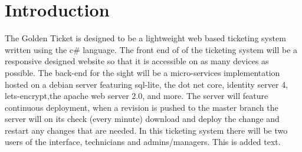 \documentclass[letterpaper]{article}
\begin{document}
\section{Introduction}
The Golden Ticket is designed to be a lightweight web based ticketing system written using the c\# language. The front end of of the ticketing system will be a responsive designed website so that it is accessible on as many devices as possible. The back-end for the sight will be a micro-services implementation hosted on a debian server featuring sql-lite, the dot net core, identity server 4, lets-encrypt,the apache web server 2.0, and more. The server will feature continuous deployment, when a revision is pushed to the master branch the server will on its check (every minute) download and deploy the change and restart any changes that are needed. In this ticketing system there will be two users of the interface, technicians and admins/managers. This is added text.
\end{document}
